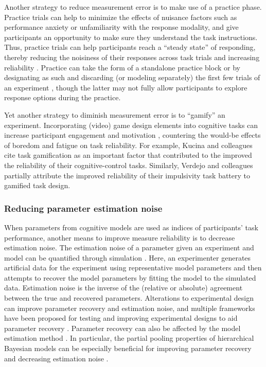 \documentclass[a4paper,12pt]{article}
\begin{document}
Another strategy to reduce measurement error is to make use of a practice phase. Practice trials can help to minimize the effects of nuisance factors such as performance anxiety or unfamiliarity with the response modality, and give participants an opportunity to make sure they understand the task instructions. Thus, practice trials can help participants reach a ``steady state'' of responding, thereby reducing the noisiness of their responses across task trials and increasing reliability \cite{alexander2003effects}. Practice can take the form of a standalone practice block or by designating as such and discarding (or modeling separately) the first few trials of an experiment \cite{mclean2018towards}, though the latter may not fully allow participants to explore response options during the practice. 

Yet another strategy to diminish measurement error is to ``gamify'' an experiment. Incorporating (video) game design elements into cognitive tasks can increase participant engagement and motivation \cite{sailer2017gamification}, countering the would-be effects of boredom and fatigue on task reliability. For example, Kucina and colleagues \cite{kucina2022solution} cite task gamification as an important factor that contributed to the improved the reliability of their cognitive-control tasks. Similarly, Verdejo and colleagues \cite{verdejo2021unified} partially attribute the improved reliability of their impulsivity task battery to gamified task design. 

\subsubsection{Reducing parameter estimation noise}

When parameters from cognitive models are used as indices of participants' task performance, another means to improve measure reliability is to decrease estimation noise. The estimation noise of a parameter given an experiment and model can be quantified through simulation \cite{wilson2019ten, palminteri2017importance}. Here, an experimenter generates artificial data for the experiment using representative model parameters and then attempts to recover the model parameters by fitting the model to the simulated data. Estimation noise is the inverse of the (relative or absolute) agreement between the true and recovered parameters. Alterations to experimental design can improve parameter recovery and estimation noise, and multiple frameworks have been proposed for testing and improving experimental designs to aid parameter recovery \cite{broomell2014parameter, melinscak2020computational}. Parameter recovery can also be affected by the model estimation method \cite{Lerche2017-yg, waltmann2022sufficient}. In particular, the partial pooling properties of hierarchical Bayesian models can be especially beneficial for improving parameter recovery and decreasing estimation noise \cite{katahira2016hierarchical}.
\end{document}
